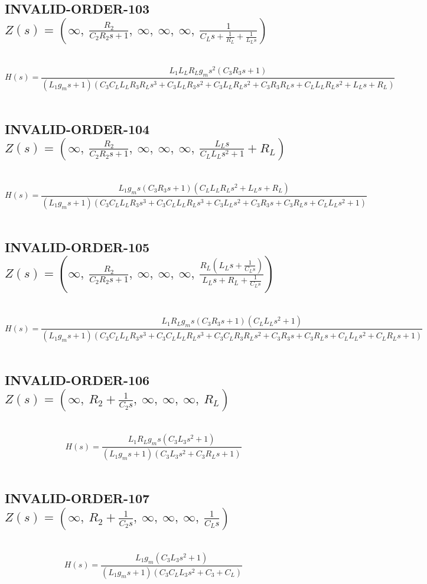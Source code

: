 \documentclass{article}
\begin{document}
\subsection{INVALID-ORDER-103 $Z(s) = \left( \infty, \  \frac{R_{2}}{C_{2} R_{2} s + 1}, \  \infty, \  \infty, \  \infty, \  \frac{1}{C_{L} s + \frac{1}{R_{L}} + \frac{1}{L_{L} s}}\right)$ } \ 
\textbf{\[H(s) = \frac{L_{1} L_{L} R_{L} g_{m} s^{2} \left(C_{3} R_{3} s + 1\right)}{\left(L_{1} g_{m} s + 1\right) \left(C_{3} C_{L} L_{L} R_{3} R_{L} s^{3} + C_{3} L_{L} R_{3} s^{2} + C_{3} L_{L} R_{L} s^{2} + C_{3} R_{3} R_{L} s + C_{L} L_{L} R_{L} s^{2} + L_{L} s + R_{L}\right)}\] } \ 
\subsection{INVALID-ORDER-104 $Z(s) = \left( \infty, \  \frac{R_{2}}{C_{2} R_{2} s + 1}, \  \infty, \  \infty, \  \infty, \  \frac{L_{L} s}{C_{L} L_{L} s^{2} + 1} + R_{L}\right)$ } \ 
\textbf{\[H(s) = \frac{L_{1} g_{m} s \left(C_{3} R_{3} s + 1\right) \left(C_{L} L_{L} R_{L} s^{2} + L_{L} s + R_{L}\right)}{\left(L_{1} g_{m} s + 1\right) \left(C_{3} C_{L} L_{L} R_{3} s^{3} + C_{3} C_{L} L_{L} R_{L} s^{3} + C_{3} L_{L} s^{2} + C_{3} R_{3} s + C_{3} R_{L} s + C_{L} L_{L} s^{2} + 1\right)}\] } \ 
\subsection{INVALID-ORDER-105 $Z(s) = \left( \infty, \  \frac{R_{2}}{C_{2} R_{2} s + 1}, \  \infty, \  \infty, \  \infty, \  \frac{R_{L} \left(L_{L} s + \frac{1}{C_{L} s}\right)}{L_{L} s + R_{L} + \frac{1}{C_{L} s}}\right)$ } \ 
\textbf{\[H(s) = \frac{L_{1} R_{L} g_{m} s \left(C_{3} R_{3} s + 1\right) \left(C_{L} L_{L} s^{2} + 1\right)}{\left(L_{1} g_{m} s + 1\right) \left(C_{3} C_{L} L_{L} R_{3} s^{3} + C_{3} C_{L} L_{L} R_{L} s^{3} + C_{3} C_{L} R_{3} R_{L} s^{2} + C_{3} R_{3} s + C_{3} R_{L} s + C_{L} L_{L} s^{2} + C_{L} R_{L} s + 1\right)}\] } \ 
\subsection{INVALID-ORDER-106 $Z(s) = \left( \infty, \  R_{2} + \frac{1}{C_{2} s}, \  \infty, \  \infty, \  \infty, \  R_{L}\right)$ } \ 
\textbf{\[H(s) = \frac{L_{1} R_{L} g_{m} s \left(C_{3} L_{3} s^{2} + 1\right)}{\left(L_{1} g_{m} s + 1\right) \left(C_{3} L_{3} s^{2} + C_{3} R_{L} s + 1\right)}\] } \ 
\subsection{INVALID-ORDER-107 $Z(s) = \left( \infty, \  R_{2} + \frac{1}{C_{2} s}, \  \infty, \  \infty, \  \infty, \  \frac{1}{C_{L} s}\right)$ } \ 
\textbf{\[H(s) = \frac{L_{1} g_{m} \left(C_{3} L_{3} s^{2} + 1\right)}{\left(L_{1} g_{m} s + 1\right) \left(C_{3} C_{L} L_{3} s^{2} + C_{3} + C_{L}\right)}\] } \ 
\end{document}
